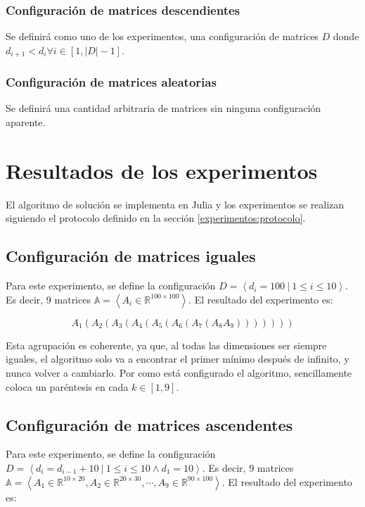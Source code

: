 \documentclass[letter]{article}
\begin{document}
\subsubsection{Configuración de matrices descendientes}

Se definirá como uno de los experimentos, una configuración de matrices $D$ donde $d_{i+1} < d_i \forall i \in [1, |D| - 1]$.

\subsubsection{Configuración de matrices aleatorias}

Se definirá una cantidad arbitraria de matrices sin ninguna configuración aparente.

\section{Resultados de los experimentos} \label{resultados}

El algoritmo de solución se implementa en Julia y los experimentos se realizan siguiendo el protocolo definido en la sección \ref{experimentos:protocolo}.

\subsection{Configuración de matrices iguales}

Para este experimento, se define la configuración $D = \left< d_i = 100 ~|~ 1 \leq i \leq 10 \right>$. Es decir, 9 matrices $\mathbb{A} = \left< A_i \in \mathbb{R}^{100 \times 100} \right>$. El resultado del experimento es: \par

\[ A_1(A_2(A_3(A_4(A_5(A_6(A_7(A_8A_9))))))) \]

Esta agrupación es coherente, ya que, al todas las dimensiones ser siempre iguales, el algoritmo solo va a encontrar el primer mínimo después de infinito, y nunca volver a cambiarlo. Por como está configurado el algoritmo, sencillamente coloca un paréntesis en cada $k \in [1, 9]$.

\subsection{Configuración de matrices ascendentes}

Para este experimento, se define la configuración $D = \left< d_i = d_{i - 1} + 10 ~|~ 1 \leq i \leq 10 \land d_1 = 10 \right>$. Es decir, 9 matrices $\mathbb{A} = \left< A_1 \in \mathbb{R}^{10 \times 20}, A_2 \in \mathbb{R}^{20 \times 30}, \cdots, A_9 \in \mathbb{R}^{90 \times 100} \right>$. El resultado del experimento es: \par
\end{document}
